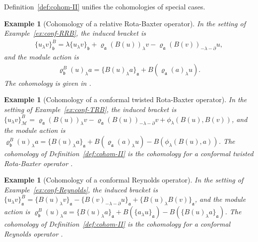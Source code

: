 \documentclass[a4paper,11pt]{article}
\def\Vs{\mathfrak{a}}
\def\Ws{\mathfrak{b}}
\def\Mod{\mathcal{M}}
\def\rep{\varrho}
\def\la{\lambda}
\def\p{\partial}
\numberwithin{equation}{section}
\newtheorem{example}[theorem]{Example}
\begin{document}
Definition~\ref{def:cohom-II} unifies the cohomologies of  special cases.
 
\begin{example}[Cohomology of a relative Rota-Baxter operator]\label{ex:coh conf-RRB}
In the setting of Example~\ref{ex:conf-RRB}, the induced bracket is
\begin{align*}
 \{u_\la v\}^B_\Ws = \la\{u_\la v\}_\Ws + \rep_\Vs(B(u))_\la v
- \rep_\Vs(B(v))_{-\la-\p}u,   
\end{align*}
and the module action is
\begin{align*}
 \rep_{\Ws}^B(u)_\la a = \{B(u)_\la a\}_\Vs + B(\rep_\Vs(a)_\la u).  
\end{align*}
The cohomology is given in \cite{YL}.
\end{example}
 
\begin{example}[Cohomology of a conformal twisted Rota-Baxter operator]
In the setting of Example~\ref{ex:conf-TRB}, the induced bracket is
$\{u_\la v\}^B_\Mod = \rep_\Vs(B(u))_\la v - \rep_\Vs(B(u))_{-\la-\p}v
+ \phi_\la(B(u),B(v))$, and the module action is
$\rep_\Ws^B(u)_\la a = \{B(u)_\la a\}_\Vs + B(\rep_\Vs(a)_\la u)
- B(\phi_\la(B(u),a))$.
The cohomology of Definition~\ref{def:cohom-II} is the
\textit{cohomology for a conformal twisted Rota-Baxter operator} \cite{YL}.
\end{example}
 
\begin{example}[Cohomology of a conformal Reynolds operator]
In the setting of Example~\ref{ex:conf-Reynolds}, the induced bracket
is $\{u_\la v\}^B_\Vs = \{B(u)_\la v\}_\Vs - \{B(v)_{-\la-\p}u\}_\Vs
+ \{B(u)_\la B(v)\}_\Vs$, and the module action is
$\rep_\Ws^B(u)_\la a = \{B(u)_\la a\}_\Vs + B(\{a_\la u\}_\Vs)
- B(\{B(u)_\la a\}_\Vs)$.
The cohomology of Definition~\ref{def:cohom-II} is the
\textit{cohomology for a conformal Reynolds operator} \cite{YL}.
\end{example}
 
\end{document}
